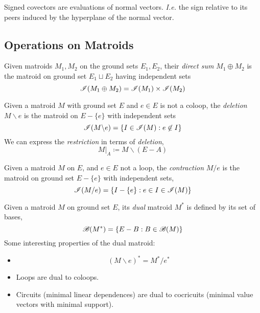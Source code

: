 \begin{definition}
    Signed covectors are evaluations of normal vectors.
    \textit{I.e.} the sign relative to its peers induced by the hyperplane of the normal vector.
\end{definition}

\subsection{Operations on Matroids}

\begin{definition}
    Given matroids $M_1, M_2$ on the ground sets $E_1, E_2$, their \textit{direct sum} $M_1 \oplus M_2$ is the matroid on ground set $E_1 \sqcup E_2$ having independent sets
    $$\mathscr{I}(M_1 \oplus M_2) = \mathscr{I}(M_1) \times \mathscr{I}(M_2)$$
\end{definition}

\begin{definition}[Deletion]
    Given a matroid $M$ with ground set $E$ and $e \in E$ is not a coloop, the \textit{deletion} $M \backslash e$ is the matroid on $E - \{ e \}$ with independent sets
    $$\mathscr{I}(M \backslash e) = \lbrace I \in \mathscr{I}(M) : e \not\in I \rbrace$$
    We can express the \textit{restriction} in terms of \textit{deletion},
    $$M|_A \coloneqq M \backslash (E - A)$$
\end{definition}

\begin{definition}[Contraction]
    Given a matroid $M$ on $E$, and $e \in E$ not a loop, the \textit{contraction} $M / e$ is the matroid on ground set $E - \{ e \}$ with independent sets,
    $$\mathscr{I}(M / e) = \{ I - \{ e\}: e \in I \in \mathscr{I}(M) \}$$
\end{definition}

\begin{definition}
    Given a matroid $M$ on ground set $E$, its \textit{dual} matroid $M^*$ is defined by its set of bases,
    $$\mathscr{B}(M^*) = \{ E - B : B \in \mathscr{B}(M) \}$$
    Some interesting properties of the dual matroid:
    \begin{itemize}
        \item $$(M \backslash e )^* = M^* / e^*$$
        \item Loops are dual to coloops.
        \item Circuits (minimal linear dependences) are dual to cocricuits (minimal value vectors with minimal support).
    \end{itemize}
\end{definition}
